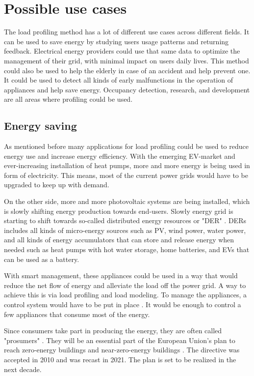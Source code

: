 \label{chapter4}
\chapter{Possible use cases}

The load profiling method has a lot of different use cases across different fields.
It can be used to save energy by studying users usage patterns and returning feedback.
Electrical energy providers could use that same data to optimize the management of their grid, with minimal impact on users daily lives.
This method could also be used to help the elderly in case of an accident and help prevent one. 
It could be used to detect all kinds of early malfunctions in the operation of appliances and help save energy.
Occupancy detection, research, and development are all areas where profiling could be used. 

\section{Energy saving}

As mentioned before many applications for load profiling could be used to reduce energy use and increase energy efficiency. 
With the emerging EV-market and ever-increasing installation of heat pumps, more and more energy is being used in form of electricity. 
This means, most of the current power grids would have to be upgraded to keep up with demand.

On the other side, more and more photovoltaic systems are being installed,
which is slowly shifting energy production towards end-users.
Slowly energy grid is starting to shift towards so-called distributed energy resources or "DER" \cite{MORENOJARAMILLO2021445}.
DERs includes all kinds of micro-energy sources such as PV, wind power, water power, and all kinds of energy accumulators that can store 
and release energy when needed such as heat pumps with hot water storage, home batteries, and EVs that can be used as a battery.

With smart management, these appliances could be used in a way that would reduce the net flow of energy and alleviate the load off the power grid.
A way to achieve this is via load profiling and load modeling. 
To manage the appliances, a control system would have to be put in place \cite{DirectLoadControll2021}.
It would be enough to control a few appliances that consume most of the energy. 

Since consumers take part in producing the energy, they are often called "prosumers" \cite{Prosumer2016}.
They will be an essential part of the European Union's plan to reach zero-energy buildings
and near-zero-energy buildings \cite{eu2021}. The directive was accepted in 2010 and was recast in 2021.
The plan is set to be realized in the next decade.


